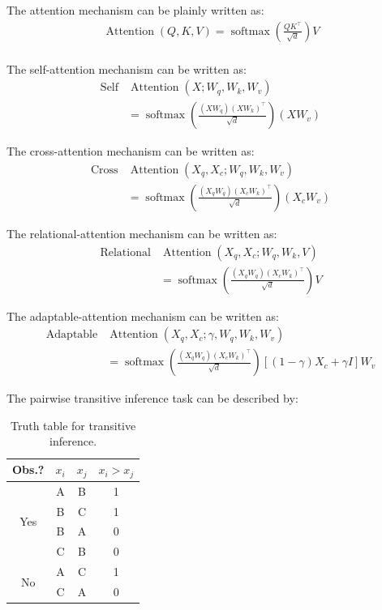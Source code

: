 \documentclass[12pt]{article}
\begin{document}
The attention mechanism can be plainly written as:
\begin{gather*} 
\operatorname{Attention}(Q, K, V)=\operatorname{softmax}\!\left(\frac{QK^\top}{\sqrt{d}}\right) V\\
\end{gather*}

The self-attention mechanism can be written as:
\begin{align*} 
\operatorname{Self}&\operatorname{Attention}(X; W_q, W_k, W_v) \\
&= \operatorname{softmax}\!\left(\frac{(XW_q)(XW_k)^\top}{\sqrt{d}}\right)(XW_v)
\end{align*}

The cross-attention mechanism can be written as:
\begin{align*} 
\operatorname{Cross}&\operatorname{Attention}(X_q, X_c; W_q, W_k, W_v) \\
&= \operatorname{softmax}\!\left(\frac{(X_qW_q)(X_cW_k)^\top}{\sqrt{d}}\right)(X_cW_v)
\end{align*}

The relational-attention mechanism can be written as:
\begin{align*} 
\operatorname{Relational}&\operatorname{Attention}(X_q, X_c; W_q, W_k, V) \\
&= \operatorname{softmax}\!\left(\frac{(X_qW_q)(X_cW_k)^\top}{\sqrt{d}}\right)V
\end{align*}

The adaptable-attention mechanism can be written as:
\begin{align*} 
\operatorname{Adaptable}&\operatorname{Attention}(X_q, X_c; \gamma, W_q, W_k, W_v) \\
&= \operatorname{softmax}\!\left(\frac{(X_qW_q)(X_cW_k)^\top}{\sqrt{d}}\right)\left[(1-\gamma)X_c+\gamma I\right]W_v
\end{align*}

The pairwise transitive inference task can be described by:
\begin{table}[h]
\centering
\begin{tabular}{c c c | c}
\hline
Obs.? & $x_i$ & $x_j$ & $x_i > x_j$ \\
\hline
\multirow{4}{*}{Yes} 
  & A & B & 1 \\
  & B & C & 1 \\
  & B & A & 0 \\
  & C & B & 0 \\
\hline
\multirow{2}{*}{No} 
  & A & C & 1 \\
  & C & A & 0 \\
\hline
\end{tabular}
\caption{Truth table for transitive inference.}
\end{table}
\end{document}
